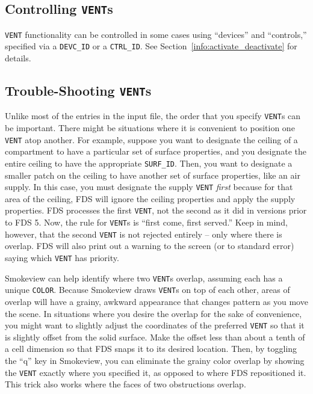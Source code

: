 \documentclass[11pt]{book}
\newcommand{\ct}{\tt\small}
\begin{document}
\subsection{\texorpdfstring{{Controlling {\tt VENT}s}}{Controlling VENTs}}

{\ct VENT} functionality can be controlled in some cases using ``devices'' and ``controls,'' specified via a {\ct DEVC\_ID} or a {\ct CTRL\_ID}.
See Section~\ref{info:activate_deactivate} for details.

\subsection{\texorpdfstring{{Trouble-Shooting {\tt VENT}s}}{Trouble-Shooting VENTs}}
\label{info:VENT_Trouble}

Unlike most of the entries in the input file, the order that you specify {\ct VENT}s can be important. There might be
situations where it is convenient to position one {\ct VENT} atop another. For example, suppose you want to designate the
ceiling of a compartment to have a particular set of surface properties, and you designate the entire ceiling to have the
appropriate {\ct SURF\_ID}. Then, you want to designate a smaller patch on the ceiling to have another set of surface
properties, like an air supply. In this case, you must designate the supply {\ct VENT} {\em first} because for that area
of the ceiling, FDS will ignore the ceiling properties and apply the supply properties. FDS processes the first {\ct VENT}, not
the second as it did in versions prior to FDS 5. Now, the rule for {\ct VENT}s is ``first come, first served.''
Keep in mind, however, that the
second {\ct VENT} is not rejected entirely -- only where there is overlap. FDS will also print out a warning to the screen (or to
standard error) saying which {\ct VENT} has priority.

Smokeview can help identify where two {\ct VENT}s overlap, assuming each has a unique {\ct COLOR}. Because Smokeview draws {\ct VENT}s
on top of each other, areas of overlap will have a grainy, awkward appearance that changes pattern as you move the scene. In situations
where you desire the overlap for the sake of convenience, you might want to slightly adjust the coordinates of the preferred {\ct VENT}
so that it is slightly offset from the solid surface. Make the offset less than about a tenth of a cell dimension so that FDS snaps it
to its desired location. Then, by toggling the ``q'' key in Smokeview, you can eliminate the grainy color overlap by showing the
{\ct VENT} exactly where you specified it, as opposed to where FDS repositioned it. This trick also works where the faces of two
obstructions overlap.
\end{document}
